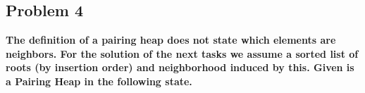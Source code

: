 \subsection{Problem 4}

\textbf{The definition of a pairing heap does not state which elements are neighbors. For the solution of the next tasks we assume a sorted list of roots (by insertion order) and neighborhood induced by this. Given is a Pairing Heap in the following state.}

\begin{center}
\end{center}

